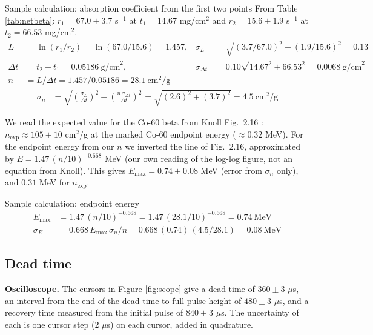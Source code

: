 \documentclass[12pt]{article}
\begin{document}
\begin{samplecalc}{Sample calculation: absorption coefficient from the first two points}
From Table \ref{tab:netbeta}: $r_1 = 67.0 \pm 3.7$ s$^{-1}$ at $t_1 = 14.67$ mg/cm$^2$ and $r_2 = 15.6 \pm 1.9$ s$^{-1}$ at $t_2 = 66.53$ mg/cm$^2$.
\begin{align*}
L &= \ln(r_1/r_2) = \ln(67.0/15.6) = 1.457, &
\sigma_L &= \sqrt{(3.7/67.0)^2 + (1.9/15.6)^2} = 0.13\\
\Delta t &= t_2 - t_1 = 0.05186\ \text{g/cm}^2, &
\sigma_{\Delta t} &= 0.10\sqrt{14.67^2 + 66.53^2} = 0.0068\ \text{g/cm}^2\\
n &= L/\Delta t = 1.457/0.05186 = 28.1\ \text{cm}^2/\text{g}
\end{align*}
\begin{align*}
\sigma_n &= \sqrt{\left(\frac{\sigma_L}{\Delta t}\right)^2 + \left(\frac{n\,\sigma_{\Delta t}}{\Delta t}\right)^2}
 = \sqrt{(2.6)^2 + (3.7)^2} = 4.5\ \text{cm}^2/\text{g}
\end{align*}
\end{samplecalc}

We read the expected value for the Co-60 beta from Knoll Fig.\ 2.16 \cite{knoll}: $n_{\text{exp}} \approx 105 \pm 10$ cm$^2$/g at the marked Co-60 endpoint energy ($\approx 0.32$ MeV). For the endpoint energy from our $n$ we inverted the line of Fig.\ 2.16, approximated by $E = 1.47\,(n/10)^{-0.668}$ MeV (our own reading of the log-log figure, not an equation from Knoll). This gives $E_{\max} = 0.74 \pm 0.08$ MeV (error from $\sigma_n$ only), and $0.31$ MeV for $n_{\text{exp}}$.

\begin{samplecalc}{Sample calculation: endpoint energy}
\begin{align*}
E_{\max} &= 1.47\,(n/10)^{-0.668} = 1.47\,(28.1/10)^{-0.668} = 0.74\ \text{MeV}\\
\sigma_E &= 0.668\,E_{\max}\,\sigma_n/n = 0.668\,(0.74)\,(4.5/28.1) = 0.08\ \text{MeV}
\end{align*}
\end{samplecalc}

\subsection{Dead time}

\textbf{Oscilloscope.} The cursors in Figure \ref{fig:scope} give a dead time of $360 \pm 3$ $\mu$s, an interval from the end of the dead time to full pulse height of $480 \pm 3$ $\mu$s, and a recovery time measured from the initial pulse of $840 \pm 3$ $\mu$s. The uncertainty of each is one cursor step (2 $\mu$s) on each cursor, added in quadrature.
\end{document}
